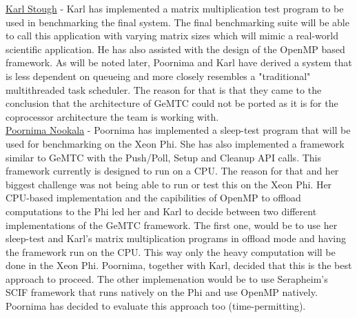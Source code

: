\documentclass[10pt, conference, compsocconf]{IEEEtran}
\begin{document}
\underline{Karl Stough} - Karl has implemented a matrix multiplication
test program to be used in benchmarking the final system. The final
benchmarking suite will be able to call this application with varying
matrix sizes which will mimic a real-world scientific application. He
has also assisted with the design of the OpenMP based framework. As
will be noted later, Poornima and Karl have derived a system that is
less dependent on queueing and more closely resembles a "traditional"
multithreaded task scheduler. The reason for that is that they came
to the conclusion that the architecture of GeMTC could not be ported
as it is for the coprocessor architecture the team is working with.\\

\underline{Poornima Nookala} - Poornima has implemented a sleep-test
program that will be used for benchmarking on the Xeon Phi. She has
also implemented a framework similar to GeMTC with the Push/Poll, Setup
and Cleanup API calls. This framework currently is designed to run
on a CPU. The reason for that and her biggest challenge was not
being able to run or test this on the Xeon Phi. Her CPU-based implementation
and the capibilities of OpenMP to offload computations to the Phi
led her and Karl to decide between two different implementations
of the GeMTC framework. The first one, would be to use her sleep-test
and Karl's matrix multiplication programs in offload mode and
having the framework run on the CPU. This way only the heavy computation
will be done in the Xeon Phi. Poornima, together with Karl, decided
that this is the best approach to proceed. The other implemenation
would be to use Serapheim's SCIF framework that runs natively on the
Phi and use OpenMP natively. Poornima has decided to evaluate this
approach too (time-permitting).\\
\end{document}
